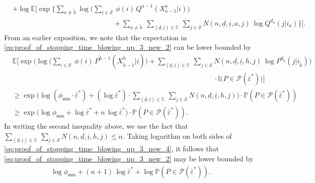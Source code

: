 {\begin{align}
	\label{eq:proof_of_stopping_time_blowing_up_3_new_2}\\
	&+\log \mathbb{E}\bigg[\exp\bigg\lbrace\sum\limits_{a\neq \tilde{h}} \log \bigg(\sum\limits_{i\in \mathcal{S}}~\phi(i)\,Q^{a-1}(X_{a-1}^a|i)\bigg) \nonumber\\
	&\hspace{6cm}+\sum\limits_{a\neq \tilde{h}}~\sum\limits_{(\underline{d}, \underline{i})\in \mathbb{S}}~\sum\limits_{j\in \mathcal{S}}N(n, \underline{d}, \underline{i}, a, j)~ \log Q^{d_a}(j|i_a)\bigg\rbrace\bigg].
	\label{eq:proof_of_stopping_time_blowing_up_3_new_3}
\end{align}
From an earlier exposition, we note that the expectation in \eqref{eq:proof_of_stopping_time_blowing_up_3_new_2} can be lower bounded by 
\begin{align}
	&\mathbb{E}\bigg[\exp\bigg(\log \bigg(\sum\limits_{i\in \mathcal{S}}~\phi(i)\, P^{\tilde{h}-1}(X_{\tilde{h}-1}^{\tilde{h}}|i)\bigg) + \sum\limits_{(\underline{d}, \underline{i})\in \mathbb{S}}~\sum\limits_{j\in \mathcal{S}}N(n, \underline{d}, \underline{i}, h, j)~ \log P^{d_{\tilde{h}}}(j|i_{\tilde{h}})\bigg)\nonumber\\
	&\hspace{12cm}\cdot \mathbb{I}\bigg(P\in \mathscr{P}(\bar{\varepsilon}^*)\bigg)\bigg]\nonumber\\
	&\geq \exp\bigg(\log (\phi_{\textsf{min}}\cdot \bar{\varepsilon}^*)+(\log \bar{\varepsilon}^*)\cdot \sum\limits_{(\underline{d}, \underline{i})\in \mathbb{S}}~\sum\limits_{j\in \mathcal{S}}N(n, \underline{d}, \underline{i}, h, j) \bigg)\cdot \mathbb{P}(P\in \mathscr{P}(\bar{\varepsilon}^*))\nonumber\\
	&\geq \exp\bigg(\log \phi_{\textsf{min}}+\log \bar{\varepsilon}^*+n\,\log \bar{\varepsilon}^*\bigg)\cdot \mathbb{P}(P\in \mathscr{P}(\bar{\varepsilon}^*)).
	\label{eq:proof_of_stopping_time_blowing_up_3_new_4}
\end{align} 
In writing the second inequality above, we use the fact that $ \sum\limits_{(\underline{d}, \underline{i})\in \mathbb{S}}~\sum\limits_{j\in \mathcal{S}}N(n, \underline{d}, \underline{i}, h, j) \leq n $. Taking logarithm on both sides of \eqref{eq:proof_of_stopping_time_blowing_up_3_new_4}, it follows that \eqref{eq:proof_of_stopping_time_blowing_up_3_new_2} may be lower bounded by 
\begin{align}
	 \log \phi_{\textsf{min}}+(n+1)\,\log\bar{\varepsilon}^*+  \log \mathbb{P}(P\in \mathscr{P}(\bar{\varepsilon}^*)).
	 \label{eq:proof_of_stopping_time_blowing_up_3_new_5}

\end{align}}
